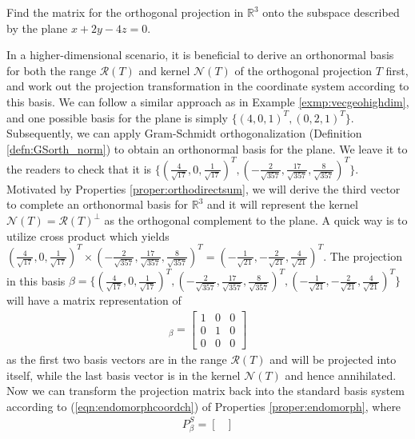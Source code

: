 \begin{exmp}
\label{exmp:planeorthoproj}
Find the matrix for the orthogonal projection in $\mathbb{R}^3$ onto the subspace described by the plane $x + 2y - 4z = 0$.
\end{exmp}
\begin{solution}
In a higher-dimensional scenario, it is beneficial to derive an orthonormal basis for both the range $\mathcal{R}(T)$ and kernel $\mathcal{N}(T)$ of the orthogonal projection $T$ first, and work out the projection transformation in the coordinate system according to this basis. We can follow a similar approach as in Example \ref{exmp:vecgeohighdim}, and one possible basis for the plane is simply $\{(4,0,1)^T, (0,2,1)^T\}$. Subsequently, we can apply Gram-Schmidt orthogonalization (Definition \ref{defn:GSorth_norm}) to obtain an orthonormal basis for the plane. We leave it to the readers to check that it is $\{(\frac{4}{\sqrt{17}}, 0, \frac{1}{\sqrt{17}})^T, (-\frac{2}{\sqrt{357}}, \frac{17}{\sqrt{357}}, \frac{8}{\sqrt{357}})^T\}$. Motivated by Properties \ref{proper:orthodirectsum}, we will derive the third vector to complete an orthonormal basis for $\mathbb{R}^3$ and it will represent the kernel $\mathcal{N}(T) = \mathcal{R}(T)^\perp$ as the orthogonal complement to the plane. A quick way is to utilize cross product which yields $(\frac{4}{\sqrt{17}}, 0, \frac{1}{\sqrt{17}})^T \times (-\frac{2}{\sqrt{357}}, \frac{17}{\sqrt{357}}, \frac{8}{\sqrt{357}})^T = (-\frac{1}{\sqrt{21}}, -\frac{2}{\sqrt{21}}, \frac{4}{\sqrt{21}})^T$. The projection in this basis $\beta = \{(\frac{4}{\sqrt{17}}, 0, \frac{1}{\sqrt{17}})^T, (-\frac{2}{\sqrt{357}}, \frac{17}{\sqrt{357}}, \frac{8}{\sqrt{357}})^T, (-\frac{1}{\sqrt{21}}, -\frac{2}{\sqrt{21}}, \frac{4}{\sqrt{21}})^T\}$ will have a matrix representation of
\begin{align*}
[T]_\beta = 
\begin{bmatrix}
1 & 0 & 0 \\
0 & 1 & 0 \\
0 & 0 & 0
\end{bmatrix}
\end{align*}
as the first two basis vectors are in the range $\mathcal{R}(T)$ and will be projected into itself, while the last basis vector is in the kernel $\mathcal{N}(T)$ and hence annihilated. Now we can transform the projection matrix back into the standard basis system according to (\ref{eqn:endomorphcoordch}) of Properties \ref{proper:endomorph}, where
\begin{align*}
P_\beta^S = 
\begin{bmatrix}

\end{bmatrix}
\end{align*}
\end{solution}
